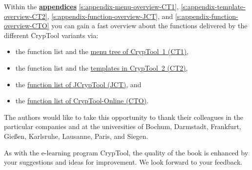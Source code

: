 Within the \hyperlink{appendix-start}{\bf appendices}
\ref{s:appendix-menu-overview-CT1},
\ref{s:appendix-template-overview-CT2},
\ref{s:appendix-function-overview-JCT}, and
\ref{s:appendix-function-overview-CTO}
you can gain a fast overview about the functions delivered by the different
CrypTool variants via:
\begin{itemize}
  \item the function list and
        the \hyperlink{appendix-menu-overview-CT1}
                      {menu tree of CrypTool~1 (CT1)},
  \item the function list and
        the \hyperlink{appendix-template-overview-CT2}
                      {templates in CrypTool~2 (CT2)},
  \item the \hyperlink{appendix-function-overview-JCT}
                      {function list of JCrypTool (JCT)}, and
  \item the \hyperlink{appendix-function-overview-CTO}
                      {function list of CrypTool-Online (CTO)}.
\end{itemize}

The authors would like to take this opportunity to thank their colleagues 
in the particular companies and at the universities of Bochum, Darmstadt,
Frankfurt, Gie\ss en, Karlsruhe, Lausanne, Paris, and Siegen.

\enlargethispage{12pt}
As with the e-learning program CrypTool, the quality of the 
book is enhanced by your suggestions and ideas for improvement. 
We look forward to your feedback.


